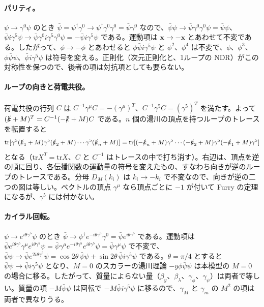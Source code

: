 \documentclass[a4paper,10pt]{ltjsarticle}
\begin{document}
\paragraph{パリティ。}$\psi\to\gamma^0\psi$ のとき $\bar\psi=\psi^\dagger\gamma^0\to\psi^\dagger\gamma^0\gamma^0=\bar\psi\gamma^0$ なので、$\bar\psi\psi\to\bar\psi\gamma^0\gamma^0\psi=\bar\psi\psi$、$\bar\psi i\gamma^5\psi\to\bar\psi\gamma^0i\gamma^5\gamma^0\psi=-\bar\psi i\gamma^5\psi$ である。運動項は $\boldsymbol x\to-\boldsymbol x$ とあわせて不変である。したがって、$\phi\to-\phi$ とあわせると $\phi\bar\psi i\gamma^5\psi$ と $\phi^2$、$\phi^4$ は不変で、$\phi$、$\phi^3$、$\phi\bar\psi\psi$、$\bar\psi i\gamma^5\psi$ は符号を変える。正則化（次元正則化と、1ループの NDR）がこの対称性を保つので、後者の項は対抗項としても要らない。

\paragraph{ループの向きと荷電共役。}荷電共役の行列 $C$ は $C^{-1}\gamma^\mu C=-(\gamma^\mu)^T$、$C^{-1}\gamma^5C=(\gamma^5)^T$ を満たす。よって $(\slashed k+M)^T=C^{-1}(-\slashed k+M)C$ である。$n$ 個の湯川の頂点を持つループのトレースを転置すると
\begin{equation*}
\mathrm{tr}[\gamma^5(\slashed k_1+M)\gamma^5(\slashed k_2+M)\cdots\gamma^5(\slashed k_n+M)]
=\mathrm{tr}[(-\slashed k_n+M)\gamma^5\cdots(-\slashed k_2+M)\gamma^5(-\slashed k_1+M)\gamma^5]
\end{equation*}
となる（$\mathrm{tr}X^T=\mathrm{tr}X$、$C$ と $C^{-1}$ はトレースの中で打ち消す）。右辺は、頂点を逆の順に回り、各伝播関数の運動量の符号を変えたもの、すなわち向きが逆のループのトレースである。分母 $D_M(k_i)$ は $k_i\to-k_i$ で不変なので、向きが逆の二つの図は等しい。ベクトルの頂点 $\gamma^\mu$ なら頂点ごとに $-1$ が付いて Furry の定理になるが、$\gamma^5$ には付かない。

\paragraph{カイラル回転。}$\psi\to e^{i\theta\gamma^5}\psi$ のとき $\bar\psi\to\psi^\dagger e^{-i\theta\gamma^5}\gamma^0=\bar\psi e^{i\theta\gamma^5}$ である。運動項は $\bar\psi e^{i\theta\gamma^5}\gamma^\mu e^{i\theta\gamma^5}\psi=\bar\psi\gamma^\mu e^{-i\theta\gamma^5}e^{i\theta\gamma^5}\psi=\bar\psi\gamma^\mu\psi$ で不変で、$\bar\psi\psi\to\bar\psi e^{2i\theta\gamma^5}\psi=\cos2\theta\,\bar\psi\psi+\sin2\theta\,\bar\psi i\gamma^5\psi$ である。$\theta=\pi/4$ とすると $\bar\psi\psi\to\bar\psi i\gamma^5\psi$ となり、$M=0$ のスカラーの湯川理論 $-y\phi\bar\psi\psi$ は本模型の $M=0$ の場合に移る。したがって、質量によらない量（$\beta_y$、$\beta_\lambda$、$\gamma_\phi$、$\gamma_\psi$）は両者で等しい。質量の項 $-M\bar\psi\psi$ は回転で $-M\bar\psi i\gamma^5\psi$ に移るので、$\gamma_M$ と $\gamma_m$ の $M^2$ の項は両者で異なりうる。
\end{document}
